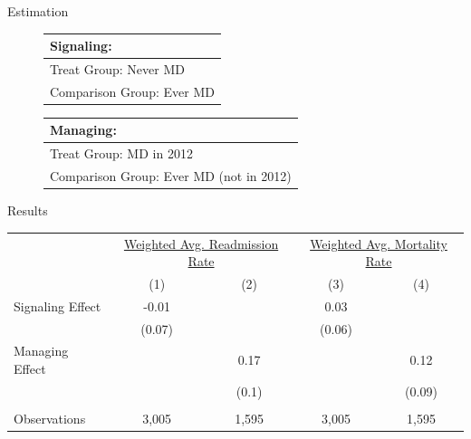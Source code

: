\documentclass[notes,11pt, aspectratio=169]{beamer}
\begin{document}
\begin{frame}{Estimation}
    \begin{figure}[ht!]
\begin{center}
 
 \begin{tabular}{| m{17em} |}
 \hline
 Signaling:\\ [0.5ex]
 \hline\hline 
 \vspace{2mm}
 Treat Group:  \hspace{15mm} Never MD \\
 \vspace{2mm}
 Comparison Group: \hspace{3mm} Ever MD  \\
 [1ex]
 \hline
 \end{tabular}
\hfil   %
 \begin{tabular}{|m{19em}|}
 \hline
 Managing:\\ [0.5ex]
 \hline\hline
 \vspace{2mm}
 Treat Group: \hspace{11mm} MD in 2012 \\
 \vspace{2mm}
 Comparison Group:  Ever MD (not in 2012)  \\
 [1ex]
 \hline
 \end{tabular}
 
\end{center}
 \end{figure}

\end{frame}

\begin{frame}{Results}
    \begin{table}[ht!]
\centering
\begin{tabular}[t]{lcccc}
\toprule
\multicolumn{1}{c}{ } & \multicolumn{2}{c}{\underline{Weighted Avg. Readmission Rate}} & \multicolumn{2}{c}{\underline{Weighted Avg. Mortality Rate}} \\
 & (1) & (2) & (3) & (4)\\
\midrule
Signaling Effect & -0.01 &  & 0.03 & \\
 & (0.07) &  & (0.06) & \\
Managing Effect &  & 0.17 &  & 0.12\\
 &  & (0.1) &  & (0.09)\\
 &  &  &  & \\
Observations & 3,005 & 1,595 & 3,005 & 1,595\\
\bottomrule
\end{tabular}
\end{table}
\end{frame}
\end{document}
